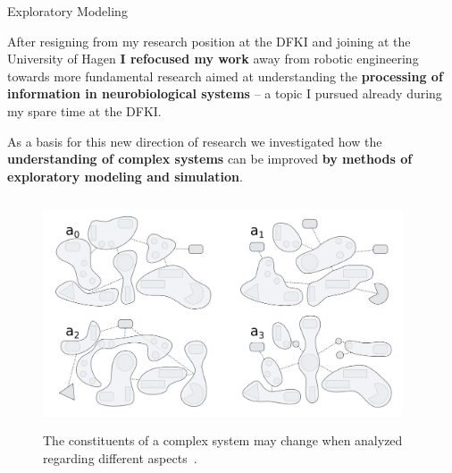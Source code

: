 


\begin{frame}{Exploratory Modeling }

\vspace{1em}
\justifying
After resigning from my research position at the DFKI and joining 
 at the University of Hagen 
{\bf I refocused my work} away from robotic engineering towards more fundamental 
research aimed at understanding the {\bf processing of information in 
neurobiological systems} -- a topic I pursued already during my spare time at 
the DFKI. 

\vspace{1.5em}
As a basis for this new direction of research we investigated how the 
{\bf understanding of complex systems} can be improved {\bf by methods of 
exploratory modeling and simulation}.


\begin{columns}[t]
\begin{column}{0.36\textwidth}
\begin{figure}
{
\includegraphics[width=\linewidth]{exploratory_modeling/aspects.jpg}
}

\vspace{-1.0em}
\caption{\scriptsize The constituents of a complex system may change
when analyzed regarding different aspects~\cite{Kerdels2012}.}
\end{figure}
\end{column}
\begin{column}{0.2\textwidth}


\end{column}
\end{columns}
\end{frame}

